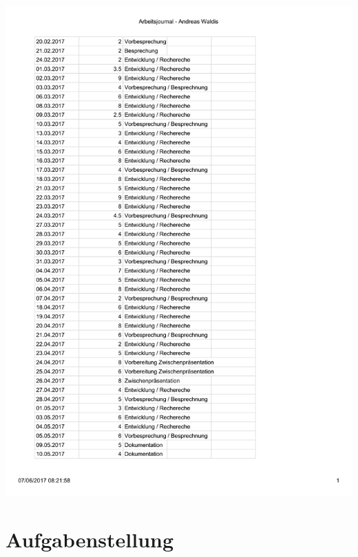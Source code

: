 \includegraphics[page=4,scale=0.8]{bilder/Arbeitsjournal.pdf}

\section{Aufgabenstellung}
\label{aufgabenstellung}


